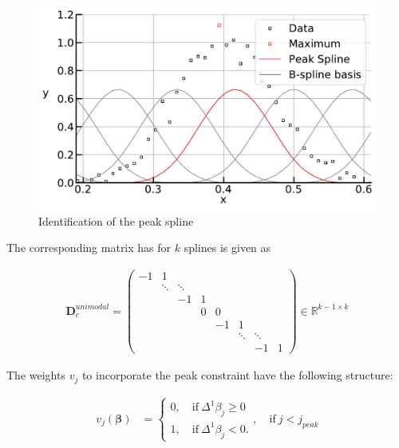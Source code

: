 \documentclass[10pt,a4paper]{article}
\begin{document}
	\begin{figure}[H]
		\centering
		\includegraphics[width=\linewidth]{../thesisplots/peak_spline.pdf}
		\caption{Identification of the peak spline}
		\label{fig:peak_spline}
	\end{figure}
	
	
	The corresponding matrix has for $k$ splines is given as 
	
	\begin{align}\label{eq:D_c_unimodal}
		\boldsymbol{D}_c^{unimodal} = \begin{pmatrix} -1 & 1 \\ 
									    				 & \ddots & \ddots  \\
									                     &        &     -1 & 1 & \\
									    			     & 		  & 	   & 0 & 0 & \\ 
													     &		  &		   &   &-1 & 1 \\
													     &		  &		   &   &   &\ddots & \ddots \\
													     & 	      &        &   &   &       &  -1    & 1
					 \end{pmatrix} \in \mathbb{R}^{k-1 \times k}
	\end{align}
	
	The weights $v_j$ to incorporate the peak constraint have the following structure:
	
	\begin{align}\label{eq:v_peak_1}
		v_j(\boldsymbol{\beta}) &= \begin{cases} 
										0, \quad \text{if} \ \Delta^1\beta_j \ge 0 \\ 
										1, \quad \text{if} \ \Delta^1\beta_j  < 0.
								  \end{cases}, \quad \text{if} \ j < j_{peak}
	\end{align}
	
\end{document}
